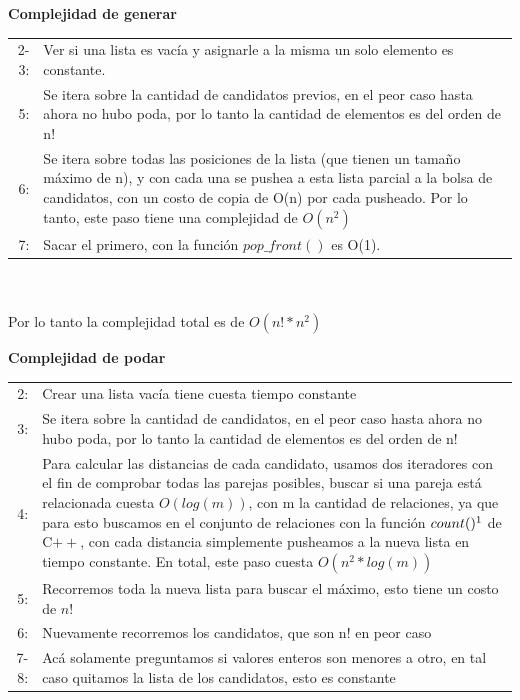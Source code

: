 \documentclass[a4paper, 10pt]{article}
\begin{document}
\textbf{Complejidad de generar}\\

\begin{tabular}{rp{15.8cm}}
2-3: & Ver si una lista es vacía y asignarle a la misma un solo elemento es constante.\\
5:& Se itera sobre la cantidad de candidatos previos, en el peor caso hasta ahora no hubo poda, por lo tanto la cantidad de elementos es del orden de n!\\
6: & Se itera sobre todas las posiciones de la lista (que tienen un tamaño máximo de n), y 
con cada una se pushea a esta lista parcial a la bolsa de candidatos, con un costo de copia de O(n) por cada pusheado. Por lo tanto, este paso tiene una complejidad de $O (n^{2})$\\
7: & Sacar el primero, con la función $pop\_front()$ es O(1).\\
\end{tabular}
\\\\

Por lo tanto la complejidad total es de $O(n! * n^{2})$\\


\textbf{Complejidad de podar}\\

\begin{tabular}{rp{15.8cm}}
2: & Crear una lista vacía tiene cuesta tiempo constante\\
3: & Se itera sobre la cantidad de candidatos, en el peor caso hasta ahora no hubo poda, por lo tanto la cantidad de elementos es del orden de n!\\
4: & Para calcular las distancias de cada candidato, usamos dos iteradores con el fin de comprobar todas las parejas posibles, buscar si una pareja está relacionada cuesta $O(log (m))$, con m la cantidad de relaciones, ya que para esto buscamos en el conjunto de relaciones con la función $count()\footnotemark$ de C$++$, con cada distancia simplemente pusheamos a la nueva lista en tiempo constante. En total, este paso cuesta $O(n^{2} * log (m))$\\
5: & Recorremos toda la nueva lista para buscar el máximo, esto tiene un costo de $n!$\\
6: & Nuevamente recorremos los candidatos, que son n! en peor caso\\
7-8: & Acá solamente preguntamos si valores enteros son menores a otro, en tal caso quitamos la lista de los candidatos, esto es constante\\
\end{tabular}
\\\\
\end{document}
